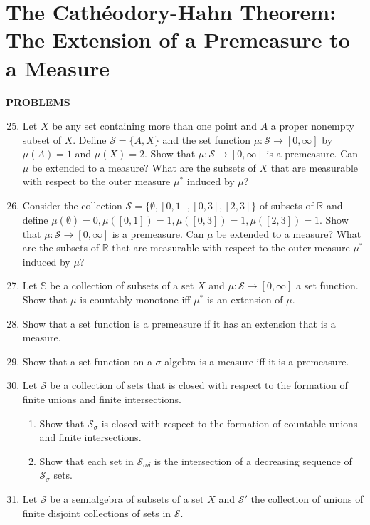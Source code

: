 \section{The Cath\'eodory-Hahn Theorem: The Extension of a Premeasure to a Measure}
\begin{center}
	\textbf{PROBLEMS}
\end{center}
\begin{enumerate}
	\setcounter{enumi}{24}
	\item Let $X$ be any set containing more than one point and $A$ a proper nonempty subset of $X$.
	Define $\mathcal{S}=\{A,X\}$ and the set function $\mu:\mathcal{S}\to[0,\infty]$ by $\mu(A)=1$ and $\mu(X)=2$.
	Show that $\mu:\mathcal{S}\to[0,\infty]$ is a premeasure.
	Can $\mu$ be extended to a measure?
	What are the subsets of $X$ that are measurable with respect to the outer measure $\mu^*$ induced by $\mu$?
	\item Consider the collection $\mathcal{S}=\{\emptyset,[0,1],[0,3],[2,3]\}$ of subsets of $\mathbb{R}$ and define $\mu(\emptyset)=0,\mu([0,1])=1,\mu([0,3])=1,\mu([2,3])=1$.
	Show that $\mu:\mathcal{S}\to[0,\infty]$ is a premeasure.
	Can $\mu$ be extended to a measure?
	What are the subsets of $\mathbb{R}$ that are measurable with respect to the outer measure $\mu^*$ induced by $\mu$?
	\item Let $\mathbb{S}$ be a collection of subsets of a set $X$ and $\mu:\mathcal{S}\to[0,\infty]$ a set function.
	Show that $\mu$ is countably monotone iff $\mu^*$ is an extension of $\mu$.
	\item Show that a set function is a premeasure if it has an extension that is a measure.
	\item Show that a set function on a $\sigma$-algebra is a measure iff it is a premeasure.
	\item Let $\mathcal{S}$ be a collection of sets that is closed with respect to the formation of finite unions and finite intersections.
	\begin{enumerate}[label=(\roman*),align=left]  
		\item Show that $\mathcal{S}_\sigma$ is closed with respect to the formation of countable unions and finite intersections.
		\item Show that each set in $\mathcal{S}_{\sigma\delta}$ is the intersection of a decreasing sequence of $\mathcal{S}_\sigma$ sets.
	\end{enumerate}
	\item Let $\mathcal{S}$ be a semialgebra of subsets of a set $X$ and $\mathcal{S}'$ the collection of unions of finite disjoint collections of sets in $\mathcal{S}$.

\end{enumerate}
